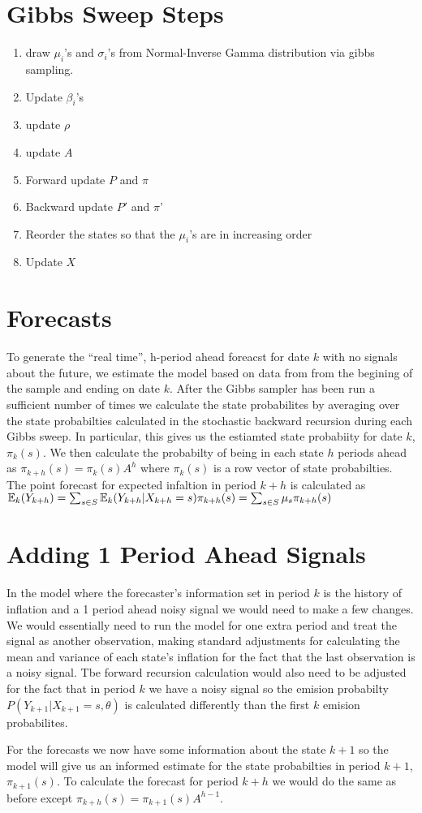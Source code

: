 \documentclass[12pt]{article}
\begin{document}
\section*{Gibbs Sweep Steps}
\begin{enumerate}
  \item draw $\mu_i$'s and $\sigma_i$'s from Normal-Inverse Gamma distribution 
  via gibbs sampling. 
  \item Update $\beta_i$'s
  \item update $\rho$
  \item update $A$
  \item Forward update $P$ and $\pi$
  \item Backward update $P'$ and $\pi$'
  \item Reorder the states so that the $\mu_i$'s are in increasing order
  \item Update $X$
\end{enumerate}

\section*{Forecasts}
To generate the ``real time'', h-period ahead foreacst for date $k$ with no signals about the future,
we estimate
the model based on data from from the begining of the sample and ending on date $k$. 
After the Gibbs sampler has been run a sufficient number of times we calculate the 
state probabilites by averaging over the state probabilties calculated in the stochastic
backward recursion during each Gibbs sweep. In particular, this gives us the estiamted 
state probabiity for date $k$, $\pi_k(s)$.  We then calculate the probabilty of being
in each state $h$ periods ahead as $\pi_{k+h}(s) = \pi_{k}(s) A^h $  where 
$\pi_{k}(s)$ is a row vector of state probabilties. The point forecast for expected 
infaltion in period $k+h$ is calculated as 
$\operatorname{\mathbb{E}}_k(Y_{k+h}) = \sum_{s \in S} \operatorname{\mathbb{E}}_k(Y_{k+h}|X_{k+h}=s) \pi_{k+h}(s) = \sum_{s \in S} \mu_s \pi_{k+h}(s) $



\section*{Adding 1 Period Ahead Signals}
In the model where the forecaster's information set in period $k$ is the history 
of inflation and a 1 period ahead noisy signal we would need to make a few changes. 
We would essentially need to run the model for one extra period and treat the signal 
as another observation, making standard adjustments for calculating the mean and variance 
of each state's inflation for the fact that the last observation is a noisy signal. Tbe
forward recursion calculation would also need to be adjusted for the fact that 
in period $k$ we have a noisy signal so the emision probabilty
 $P(Y_{k+1} | X_{k+1}=s, \theta) $ is calculated 
 differently than the first $k$ emision probabilites.

 For the forecasts we now have some information about the state $k+1$ so the model
 will give us an informed estimate for the state probabilties in period $k+1$,
 $\pi_{k+1}(s)$. To calculate the forecast for period $k+h$ we would do the same as 
 before except $\pi_{k+h}(s) = \pi_{k+1}(s) A^{h-1} $. 
\end{document}
